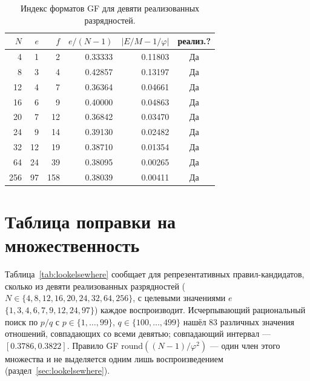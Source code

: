 \documentclass[11pt,a4paper]{article}
\theoremstyle{plain}
\begin{document}
\begin{table}[h]
\centering
\caption{Индекс форматов GF для девяти реализованных разрядностей.}
\label{tab:format-index}
\begin{tabular}{rrrrrc}
\toprule
$N$ & $e$ & $f$ & $e/(N-1)$ & $|E/M - 1/\varphi|$ & реализ.? \\
\midrule
4   & 1  & 2   & 0.33333 & 0.11803 & Да \\
8   & 3  & 4   & 0.42857 & 0.13197 & Да \\
12  & 4  & 7   & 0.36364 & 0.04661 & Да \\
16  & 6  & 9   & 0.40000 & 0.04863 & Да \\
20  & 7  & 12  & 0.36842 & 0.03470 & Да \\
24  & 9  & 14  & 0.39130 & 0.02482 & Да \\
32  & 12 & 19  & 0.38710 & 0.01354 & Да \\
64  & 24 & 39  & 0.38095 & 0.00265 & Да \\
256 & 97 & 158 & 0.38039 & 0.00411 & Да \\
\bottomrule
\end{tabular}
\end{table}

\section{Таблица поправки на множественность}\label{app:lookelsewhere}

Таблица~\ref{tab:lookelsewhere} сообщает для репрезентативных правил-кандидатов,
сколько из девяти реализованных разрядностей
(\(N \in \{4,8,12,16,20,24,32,64,256\}\), с целевыми значениями \(e\)
\(\{1,3,4,6,7,9,12,24,97\}\)) каждое воспроизводит. Исчерпывающий рациональный
поиск по \(p/q\) с \(p \in \{1,\dots,99\}\), \(q \in \{100,\dots,499\}\) нашёл
83 различных значения отношений, совпадающих со всеми девятью; совпадающий
интервал --- \([0.3786, 0.3822]\). Правило GF
\(\mathrm{round}((N-1)/\varphi^{2})\) --- один член этого множества и не
выделяется одним лишь воспроизведением (раздел~\ref{sec:lookelsewhere}).
\end{document}
